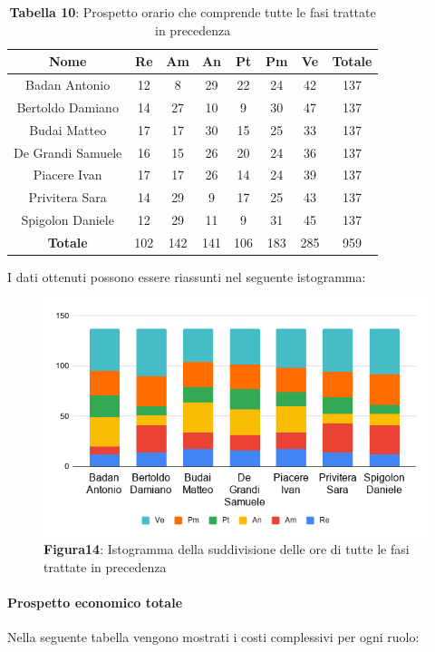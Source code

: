 \begin{table}[H]
	\centering
	\renewcommand{\arraystretch}{1.5}
	\begin{tabular}{|c|c|c|c|c|c|c|c|}
		\hline
		\rowcolor{lighter-grayer}
Nome & Re & Am & An & Pt & Pm & Ve & Totale \\ \hline
Badan Antonio & 12 & 8 & 29 & 22 & 24 & 42 & 137 \\ \hline
Bertoldo Damiano & 14 & 27 & 10 & 9 & 30 & 47 & 137 \\ \hline
Budai Matteo & 17 & 17 & 30 & 15 & 25 & 33 & 137 \\ \hline
De Grandi Samuele & 16 & 15 & 26 & 20 & 24 & 36 & 137 \\ \hline
Piacere Ivan & 17 & 17 & 26 & 14 & 24 & 39 & 137 \\ \hline
Privitera Sara & 14 & 29 & 9 & 17 & 25 & 43 & 137 \\ \hline
Spigolon Daniele & 12 & 29 & 11 & 9 & 31 & 45 & 137 \\ \hline
\textbf{Totale} & 102 & 142 & 141 & 106 & 183 & 285 & 959 \\ \hline
	\end{tabular}
	\caption*{\textbf{Tabella 10}: Prospetto orario che comprende tutte le fasi trattate in precedenza\\}
\end{table}	
I dati ottenuti possono essere riassunti nel seguente istogramma:

\begin{figure}[H]
	\centering
	\includegraphics[width=0.7\linewidth]{res/images/IstogrammaTotale.png}
	\caption*{\textbf{Figura14}: Istogramma della suddivisione delle ore di tutte le fasi trattate in precedenza}
	\label{fig:Figura10}
\end{figure}

\paragraph{Prospetto economico totale}
Nella seguente tabella vengono mostrati i costi complessivi per ogni ruolo:

